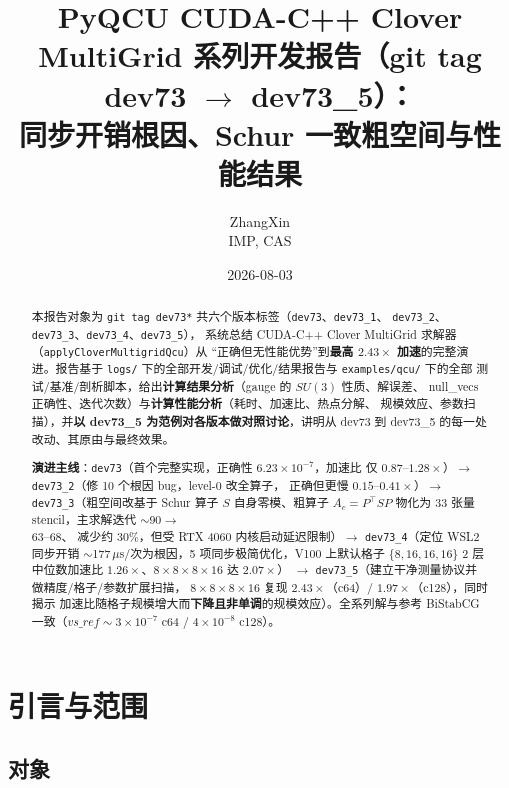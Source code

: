 \documentclass[11pt,a4paper]{article}
\title{\textbf{PyQCU CUDA-C++ Clover MultiGrid 系列开发报告（git tag dev73 $\rightarrow$ dev73\_5）：\\
同步开销根因、Schur 一致粗空间与性能结果}}
\author{ZhangXin \\ IMP, CAS}
\date{2026-08-03}
\begin{document}
\maketitle

\begin{abstract}
本报告对象为 \texttt{git tag dev73*} 共六个版本标签（\texttt{dev73}、\texttt{dev73\_1}、
\texttt{dev73\_2}、\texttt{dev73\_3}、\texttt{dev73\_4}、\texttt{dev73\_5}），
系统总结 CUDA-C++ Clover MultiGrid 求解器（\texttt{applyCloverMultigridQcu}）从
``正确但无性能优势''到\textbf{最高 $2.43\times$ 加速}的完整演进。报告基于
\texttt{logs/} 下的全部开发/调试/优化/结果报告与 \texttt{examples/qcu/} 下的全部
测试/基准/剖析脚本，给出\textbf{计算结果分析}（gauge 的 $SU(3)$ 性质、解误差、
null\_vecs 正确性、迭代次数）与\textbf{计算性能分析}（耗时、加速比、热点分解、
规模效应、参数扫描），并\textbf{以 dev73\_5 为范例对各版本做对照讨论}，讲明从
dev73 到 dev73\_5 的每一处改动、其原由与最终效果。

\vspace{1em}
\textbf{演进主线}：\texttt{dev73}（首个完整实现，正确性 $6.23\times10^{-7}$，加速比
仅 $0.87$--$1.28\times$）$\rightarrow$ \texttt{dev73\_2}（修 10 个根因 bug，level-0 改全算子，
正确但更慢 $0.15$--$0.41\times$）$\rightarrow$ \texttt{dev73\_3}（粗空间改基于 Schur 算子
$S$ 自身零模、粗算子 $A_c=P^\top S P$ 物化为 33 张量 stencil，主求解迭代 $\sim$90$\to$63--68、
减少约 30\%，但受 RTX 4060 内核启动延迟限制）$\rightarrow$ \texttt{dev73\_4}（定位 WSL2
同步开销 $\sim$177\,$\mu$s/次为根因，5 项同步极简优化，V100 上默认格子
$\{8,16,16,16\}$ 2 层中位数加速比 $1.26\times$、$8\times8\times8\times16$ 达 $2.07\times$）
$\rightarrow$ \texttt{dev73\_5}（建立干净测量协议并做精度/格子/参数扩展扫描，
$8\times8\times8\times16$ 复现 $2.43\times$（c64）/ $1.97\times$（c128），同时揭示
加速比随格子规模增大而\textbf{下降且非单调}的规模效应）。全系列解与参考 BiStabCG
一致（$vs\_ref\sim3\times10^{-7}$ c64 / $4\times10^{-8}$ c128）。
\end{abstract}

\tableofcontents

\section{引言与范围}
\label{sec:intro}

\subsection{对象}
\label{sec:objects}
\end{document}
